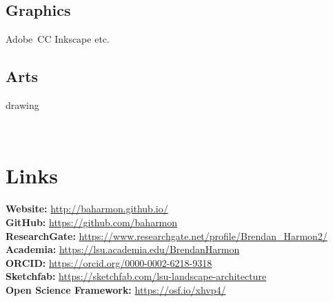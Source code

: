 \documentclass[]{baharmon_cv}
\renewcommand{\baselinestretch}{1.15}
\begin{document}
{\begin{minipage}[t]{0.2\textwidth}
\subsection{Graphics}
\vspace*{0.1cm}
Adobe~CC \textbullet{} Inkscape \textbullet{} etc. \\ 
\linespread{0.1}
%
\subsection{Arts}
\vspace*{0.1cm}
drawing \\ 
\linespread{0.1}
\end{minipage} 
%
\\
}

\sectiondivider


\section{Links} 
\textbf{Website:} \href{http://baharmon.github.io/}{http://baharmon.github.io/}\\ 
\textbf{GitHub:} \href{https://github.com/baharmon}{https://github.com/baharmon}\\ 
\textbf{ResearchGate:} \href{https://www.researchgate.net/profile/Brendan\_Harmon2/}{https://www.researchgate.net/profile/Brendan\_Harmon2/}\\
\textbf{Academia:} \href{https://lsu.academia.edu/BrendanHarmon}{https://lsu.academia.edu/BrendanHarmon}\\
\textbf{ORCID:} \href{https://orcid.org/0000-0002-6218-9318}{https://orcid.org/0000-0002-6218-9318}\\
\textbf{Sketchfab:} \href{https://sketchfab.com/lsu-landscape-architecture}{https://sketchfab.com/lsu-landscape-architecture}\\
\textbf{Open Science Framework:} \href{https://osf.io/xhvp4/}{https://osf.io/xhvp4/}

\pagebreak


\renewcommand{\baselinestretch}{1.1}
\end{document}
